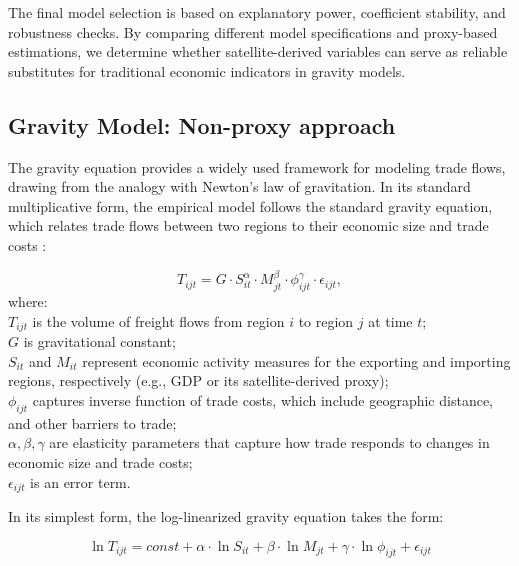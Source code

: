The final model selection is based on explanatory power, coefficient stability, and robustness checks. By comparing different model specifications and proxy-based estimations, we determine whether satellite-derived variables can serve as reliable substitutes for traditional economic indicators in gravity models.

\subsection{Gravity Model: Non-proxy approach}

The gravity equation provides a widely used framework for modeling trade flows, drawing from the analogy with Newton’s law of gravitation. In its standard multiplicative form, the empirical model follows the standard gravity equation, which relates trade flows between two regions to their economic size and trade costs \parencite{tinbergen1962shaping, anderson2003gravity}:

\begin{equation}
    T_{ijt} = G\cdot S_{it}^{\alpha} \cdot M_{jt}^{\beta}\cdot\phi_{ijt}^{\gamma}\cdot\epsilon_{ijt},
\end{equation}
where:
\\ \-\hspace{0.5cm} $T_{ijt}$ is the volume of freight flows from region $i$ to region $j$ at time $t$;
\\ \-\hspace{0.5cm} $G$ is gravitational constant;
\\ \-\hspace{0.5cm} $S_{it}$ and $M_{it}$ represent economic activity measures for the exporting and importing regions, respectively (e.g., GDP or its satellite-derived proxy);
\\ \-\hspace{0.5cm} $\phi_{ijt}$ captures inverse function of trade costs, which include geographic distance, and other barriers to trade;
\\ \-\hspace{0.5cm} $\alpha, \beta, \gamma$ are elasticity parameters that capture how trade responds to changes in economic size and trade costs;
\\ \-\hspace{0.5cm} $\epsilon_{ijt}$ is an error term.

In its simplest form, the log-linearized gravity equation takes the form:

\begin{equation}
    \ln T_{ijt} = const + \alpha \cdot \ln S_{it}+\beta \cdot \ln M_{jt}+\gamma \cdot \ln \phi_{ijt}+\epsilon_{ijt}
\end{equation}

